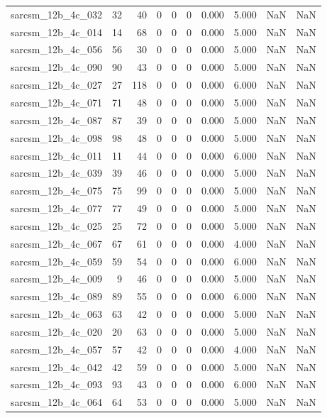 \documentclass{article}
\begin{document}
\begin{longtable}{lrrrrrrrrr}
sarcsm\_12b\_4c\_032 & 32 & 40 & 0 & 0 & 0 & 0.000 & 5.000 & NaN & NaN \\
sarcsm\_12b\_4c\_014 & 14 & 68 & 0 & 0 & 0 & 0.000 & 5.000 & NaN & NaN \\
sarcsm\_12b\_4c\_056 & 56 & 30 & 0 & 0 & 0 & 0.000 & 5.000 & NaN & NaN \\
sarcsm\_12b\_4c\_090 & 90 & 43 & 0 & 0 & 0 & 0.000 & 5.000 & NaN & NaN \\
sarcsm\_12b\_4c\_027 & 27 & 118 & 0 & 0 & 0 & 0.000 & 6.000 & NaN & NaN \\
sarcsm\_12b\_4c\_071 & 71 & 48 & 0 & 0 & 0 & 0.000 & 5.000 & NaN & NaN \\
sarcsm\_12b\_4c\_087 & 87 & 39 & 0 & 0 & 0 & 0.000 & 5.000 & NaN & NaN \\
sarcsm\_12b\_4c\_098 & 98 & 48 & 0 & 0 & 0 & 0.000 & 5.000 & NaN & NaN \\
sarcsm\_12b\_4c\_011 & 11 & 44 & 0 & 0 & 0 & 0.000 & 6.000 & NaN & NaN \\
sarcsm\_12b\_4c\_039 & 39 & 46 & 0 & 0 & 0 & 0.000 & 5.000 & NaN & NaN \\
sarcsm\_12b\_4c\_075 & 75 & 99 & 0 & 0 & 0 & 0.000 & 5.000 & NaN & NaN \\
sarcsm\_12b\_4c\_077 & 77 & 49 & 0 & 0 & 0 & 0.000 & 5.000 & NaN & NaN \\
sarcsm\_12b\_4c\_025 & 25 & 72 & 0 & 0 & 0 & 0.000 & 5.000 & NaN & NaN \\
sarcsm\_12b\_4c\_067 & 67 & 61 & 0 & 0 & 0 & 0.000 & 4.000 & NaN & NaN \\
sarcsm\_12b\_4c\_059 & 59 & 54 & 0 & 0 & 0 & 0.000 & 6.000 & NaN & NaN \\
sarcsm\_12b\_4c\_009 & 9 & 46 & 0 & 0 & 0 & 0.000 & 5.000 & NaN & NaN \\
sarcsm\_12b\_4c\_089 & 89 & 55 & 0 & 0 & 0 & 0.000 & 6.000 & NaN & NaN \\
sarcsm\_12b\_4c\_063 & 63 & 42 & 0 & 0 & 0 & 0.000 & 5.000 & NaN & NaN \\
sarcsm\_12b\_4c\_020 & 20 & 63 & 0 & 0 & 0 & 0.000 & 5.000 & NaN & NaN \\
sarcsm\_12b\_4c\_057 & 57 & 42 & 0 & 0 & 0 & 0.000 & 4.000 & NaN & NaN \\
sarcsm\_12b\_4c\_042 & 42 & 59 & 0 & 0 & 0 & 0.000 & 5.000 & NaN & NaN \\
sarcsm\_12b\_4c\_093 & 93 & 43 & 0 & 0 & 0 & 0.000 & 6.000 & NaN & NaN \\
sarcsm\_12b\_4c\_064 & 64 & 53 & 0 & 0 & 0 & 0.000 & 5.000 & NaN & NaN \\

\end{longtable}
\end{document}
